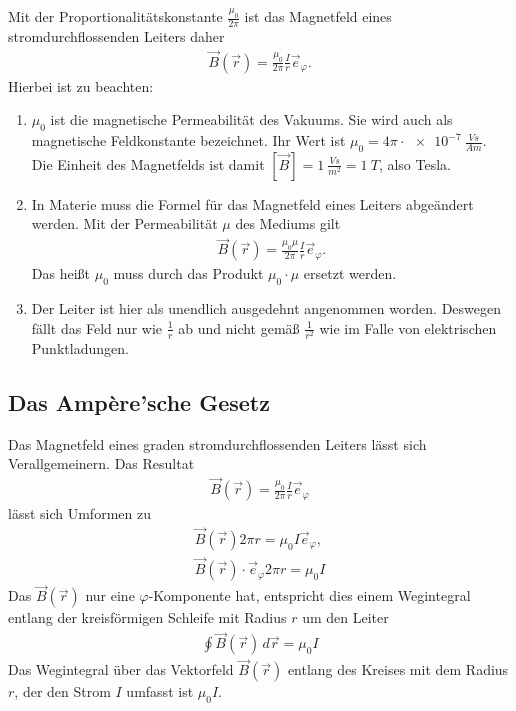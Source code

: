 \documentclass{scrartcl}
\begin{document}
Mit der Proportionalitätskonstante $\frac{\mu_0}{2\pi}$ ist das Magnetfeld eines stromdurchflossenden
Leiters daher
\begin{align}
    \vec{B}(\vec{r})=\frac{\mu_0}{2\pi}\frac{I}{r}\vec{e}_\varphi.
\end{align}
Hierbei ist zu beachten:
\begin{enumerate}
    \item $\mu_0$ ist die magnetische Permeabilität des Vakuums. Sie wird auch als magnetische Feldkonstante bezeichnet.
    Ihr Wert ist $\mu_0=4\pi\cdot\SI{ e-7}{\frac{V s}{A m}}$. Die Einheit des Magnetfelds ist damit $[\vec{B}]=\SI{1}{\frac{V s}{m^2}}=\SI{1}{T}$, also Tesla.
    \item In Materie muss die Formel für das Magnetfeld eines Leiters abgeändert werden. Mit der Permeabilität $\mu$ des Mediums gilt
    \begin{align}
        \vec{B}(\vec{r})=\frac{\mu_0\mu}{2\pi}\frac{I}{r}\vec{e}_\varphi.
    \end{align}
    Das heißt $\mu_0$ muss durch das Produkt $\mu_0\cdot \mu$ ersetzt werden.
    \item Der Leiter ist hier als unendlich ausgedehnt angenommen worden. Deswegen fällt das Feld nur wie $\frac{1}{r}$ ab und nicht gemäß $\frac{1}{r^2}$ wie im Falle von elektrischen Punktladungen.
\end{enumerate}

\subsection{Das Ampère'sche Gesetz}
Das Magnetfeld eines graden stromdurchflossenden Leiters lässt sich Verallgemeinern.
Das Resultat 
\begin{align}
    \vec{B}(\vec{r})=\frac{\mu_0}{2\pi}\frac{I}{r}\vec{e}_\varphi
\end{align}
lässt sich Umformen zu 
\begin{align}
    \vec{B}(\vec{r})2\pi r=\mu_0 I \vec{e}_\varphi,\\
    \vec{B}(\vec{r})\cdot \vec{e}_\varphi 2\pi r=\mu_0 I
\end{align}
Das $\vec{B}(\vec{r})$ nur eine $\varphi$-Komponente hat, entspricht dies einem Wegintegral entlang der kreisförmigen Schleife mit Radius $r$ um den Leiter
\begin{align}    
\boxed{\oint \vec{B}(\vec{r})\, d\vec{r}=\mu_0 I}
\end{align}
Das Wegintegral über das Vektorfeld $\vec{B}(\vec{r})$ entlang des Kreises mit dem Radius $r$, der den Strom $I$ umfasst ist $\mu_0 I$.\\
\end{document}
